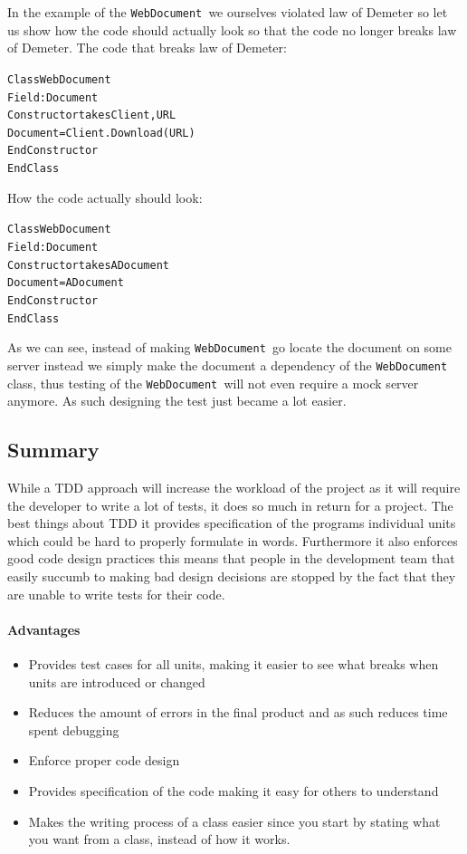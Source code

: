 In the example of the \texttt{WebDocument }we ourselves violated law
of Demeter so let us show how the code should actually look so that
the code no longer breaks law of Demeter. The code that breaks law
of Demeter:

\begin{alltt}
Class WebDocument 	
    Field: Document 	
    Constructor takes Client, URL 		
        Document = Client.Download(URL) 	
    EndConstructor 
EndClass
\end{alltt}

How the code actually should look:

\begin{alltt}
Class WebDocument 	
    Field: Document 	
    Constructor takes ADocument 		
        Document = ADocument 	
    EndConstructor 
EndClass
\end{alltt}

As we can see, instead of making \texttt{WebDocument }go locate the
document on some server instead we simply make the document a dependency
of the \texttt{WebDocument }class, thus testing of the \texttt{WebDocument
}will not even require a mock server anymore. As such designing the
test just became a lot easier.


\subsection*{Summary}

While a TDD approach will increase the workload of the project as
it will require the developer to write a lot of tests, it does so
much in return for a project. The best things about TDD it provides
specification of the programs individual units which could be hard
to properly formulate in words. Furthermore it also enforces good
code design practices this means that people in the development team
that easily succumb to making bad design decisions are stopped by
the fact that they are unable to write tests for their code.


\paragraph*{Advantages}
\begin{itemize}
\item Provides test cases for all units, making it easier to see what breaks
when units are introduced or changed
\item Reduces the amount of errors in the final product and as such reduces
time spent debugging
\item Enforce proper code design
\item Provides specification of the code making it easy for others to understand
\item Makes the writing process of a class easier since you start by stating
what you want from a class, instead of how it works.
\end{itemize}

